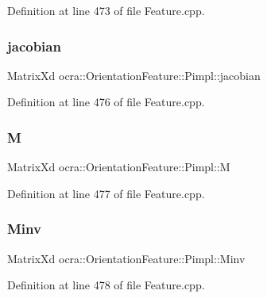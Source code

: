 Definition at line 473 of file Feature.\+cpp.

\hypertarget{structocra_1_1OrientationFeature_1_1Pimpl_ae01a611368d744168c0b1cb036e9f3ca}{}\label{structocra_1_1OrientationFeature_1_1Pimpl_ae01a611368d744168c0b1cb036e9f3ca} 
\subsubsection{\texorpdfstring{jacobian}{jacobian}}
{\footnotesize\ttfamily Matrix\+Xd ocra\+::\+Orientation\+Feature\+::\+Pimpl\+::jacobian}



Definition at line 476 of file Feature.\+cpp.

\hypertarget{structocra_1_1OrientationFeature_1_1Pimpl_aad4500eb6e53d95fa7727e448616a312}{}\label{structocra_1_1OrientationFeature_1_1Pimpl_aad4500eb6e53d95fa7727e448616a312} 
\subsubsection{\texorpdfstring{M}{M}}
{\footnotesize\ttfamily Matrix\+Xd ocra\+::\+Orientation\+Feature\+::\+Pimpl\+::M}



Definition at line 477 of file Feature.\+cpp.

\hypertarget{structocra_1_1OrientationFeature_1_1Pimpl_a4d3638027be99fabf73eefd55015ce44}{}\label{structocra_1_1OrientationFeature_1_1Pimpl_a4d3638027be99fabf73eefd55015ce44} 
\subsubsection{\texorpdfstring{Minv}{Minv}}
{\footnotesize\ttfamily Matrix\+Xd ocra\+::\+Orientation\+Feature\+::\+Pimpl\+::\+Minv}



Definition at line 478 of file Feature.\+cpp.

